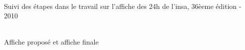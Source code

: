 \begin{center}
                \\
                Suivi des étapes dans le travail sur l'affiche des 24h de l'insa, 36èeme édition - 2010
            \end{center}
            
            \begin{center}
                \\
                Affiche proposé et affiche finale  
            \end{center}
            
